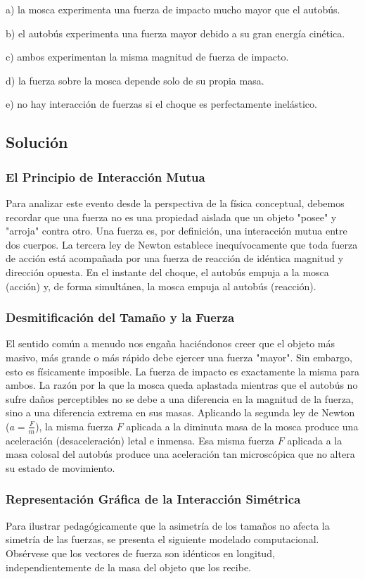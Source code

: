 \documentclass[12pt]{article}
\begin{document}
a) la mosca experimenta una fuerza de impacto mucho mayor que el autobús.

b) el autobús experimenta una fuerza mayor debido a su gran energía cinética.

c) ambos experimentan la misma magnitud de fuerza de impacto.

d) la fuerza sobre la mosca depende solo de su propia masa.

e) no hay interacción de fuerzas si el choque es perfectamente inelástico.

\subsection*{Solución}

\subsubsection*{El Principio de Interacción Mutua}
Para analizar este evento desde la perspectiva de la física conceptual, debemos recordar que una fuerza no es una propiedad aislada que un objeto "posee" y "arroja" contra otro. Una fuerza es, por definición, una interacción mutua entre dos cuerpos. La tercera ley de Newton establece inequívocamente que toda fuerza de acción está acompañada por una fuerza de reacción de idéntica magnitud y dirección opuesta. En el instante del choque, el autobús empuja a la mosca (acción) y, de forma simultánea, la mosca empuja al autobús (reacción). 

\subsubsection*{Desmitificación del Tamaño y la Fuerza}
El sentido común a menudo nos engaña haciéndonos creer que el objeto más masivo, más grande o más rápido debe ejercer una fuerza "mayor". Sin embargo, esto es físicamente imposible. La fuerza de impacto es exactamente la misma para ambos. La razón por la que la mosca queda aplastada mientras que el autobús no sufre daños perceptibles no se debe a una diferencia en la magnitud de la fuerza, sino a una diferencia extrema en sus masas. 
Aplicando la segunda ley de Newton ($a = \frac{F}{m}$), la misma fuerza $F$ aplicada a la diminuta masa de la mosca produce una aceleración (desaceleración) letal e inmensa. Esa misma fuerza $F$ aplicada a la masa colosal del autobús produce una aceleración tan microscópica que no altera su estado de movimiento.

\subsubsection*{Representación Gráfica de la Interacción Simétrica}
Para ilustrar pedagógicamente que la asimetría de los tamaños no afecta la simetría de las fuerzas, se presenta el siguiente modelado computacional. Obsérvese que los vectores de fuerza son idénticos en longitud, independientemente de la masa del objeto que los recibe.
\end{document}
